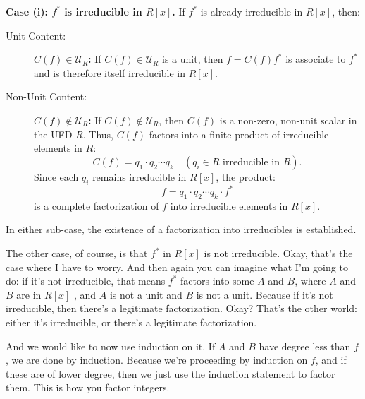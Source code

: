 \begin{proofWrapper}
\begin{content}
\textbf{Case (i): $f^*$ is irreducible in $R[x]$.}
If $f^*$ is already irreducible in $R[x]$, then:
\begin{description}
    \item[Unit Content:] \textbf{$C(f) \in \mathcal{U}_R$:} If $C(f) \in \mathcal{U}_R$ is a unit, then $f = C(f) f^*$ is associate to $f^*$ and is therefore itself irreducible in $R[x]$.
    \item[Non-Unit Content:] \textbf{$C(f) \notin \mathcal{U}_R$:} If $C(f) \notin \mathcal{U}_R$, then $C(f)$ is a non-zero, non-unit scalar in the UFD $R$. Thus, $C(f)$ factors into a finite product of irreducible elements in $R$:
    \[
    C(f) = q_1 \cdot q_2 \cdots q_k \quad (q_i \in R \text{ irreducible in } R).
    \]
    Since each $q_i$ remains irreducible in $R[x]$, the product:
    \[
    f = q_1 \cdot q_2 \cdots q_k \cdot f^*
    \]
    is a complete factorization of $f$ into irreducible elements in $R[x]$.
\end{description}
In either sub-case, the existence of a factorization into irreducibles is established.
\end{content}

\begin{speech}[00:27:36 - 00:29:34]
The other case, of course, is that $f^*$ in $R[x]$ is not irreducible.  Okay, that's the case where I have to worry. And then again you can imagine what I'm going to do: if it's not irreducible, that means $f^*$ factors into some $A$ and $B$,  where $A$ and $B$ are in $R[x]$ , and $A$ is not a unit and $B$ is not a unit.  Because if it's not irreducible, then there's a legitimate factorization. Okay? That's the other world: either it's irreducible, or there's a legitimate factorization.

And we would like to now use induction on it. If $A$ and $B$ have degree less than $f$, we are done by induction.  Because we're proceeding by induction on $f$, and if these are of lower degree, then we just use the induction statement to factor them. This is how you factor integers.


\end{speech}
\end{proofWrapper}
